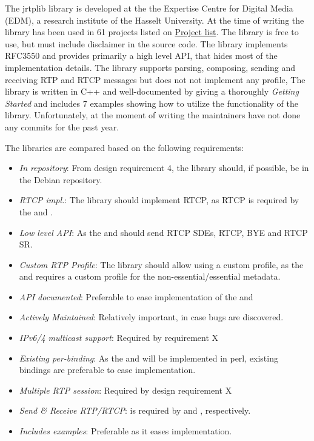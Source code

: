 The jrtplib library is developed at the the Expertise Centre for Digital Media (EDM), a research institute of the Hasselt University. At the time of writing the library has been used in 61 projects listed on \href{http://research.edm.uhasselt.be/jori/cgi-bin/listprojects.py?name=jrtplib}{Project list}. The library is free to use, but must include disclaimer in the source code. The library implements RFC3550 and provides primarily a high level API, that hides most of the implementation details. The library supports parsing, composing, sending and receiving RTP and RTCP messages but does not not implement any profile, The library is written in C++ and well-documented by giving a thoroughly \textit{Getting Started} and includes 7 examples showing how to utilize the functionality of the library. Unfortunately, at the moment of writing the maintainers have not done any commits for the past year.

The libraries are compared based on the following requirements:
\begin{itemize}
	\item \textit{In repository}: From design requirement 4, the library should, if possible, be in the Debian repository.
	\item \textit{RTCP impl.}: The library should implement RTCP, as RTCP is required by the \pub{} and \sub{}.
	\item \textit{Low level API}: As the \pub{} and \sub{} should send RTCP SDEs, RTCP, BYE and RTCP SR.
	\item \textit{Custom RTP Profile}: The library should allow using a custom profile, as the \pub{} and \sub{} requires a custom profile for the non-essential/essential metadata.
	\item \textit{API documented}: Preferable to ease implementation of the \pub{} and \sub{}
	\item \textit{Actively Maintained}: Relatively important, in case bugs are discovered.
	\item \textit{IPv6/4 multicast support}: Required by requirement X 
	\item \textit{Existing per-binding}: As the \pub{} and \sub{} will be implemented in perl, existing bindings are preferable to ease implementation.
	\item \textit{Multiple RTP session}: Required by design requirement X
	\item \textit{Send \& Receive RTP/RTCP}: is required by \pub{} and \sub{}, respectively.
	\item \textit{Includes examples}: Preferable as it eases implementation.
\end{itemize}

